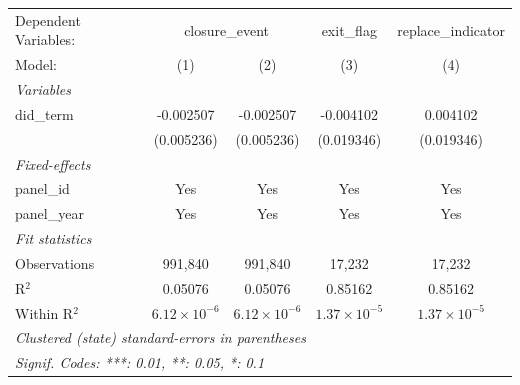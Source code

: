 
\begingroup
\centering
\begin{tabular}{lcccc}
   \tabularnewline \midrule \midrule
   Dependent Variables: & \multicolumn{2}{c}{closure\_event} & exit\_flag & replace\_indicator\\
   Model:       & (1)                   & (2)                   & (3)                   & (4)\\  
   \midrule
   \emph{Variables}\\
   did\_term    & -0.002507             & -0.002507             & -0.004102             & 0.004102\\   
                & (0.005236)            & (0.005236)            & (0.019346)            & (0.019346)\\   
   \midrule
   \emph{Fixed-effects}\\
   panel\_id    & Yes                   & Yes                   & Yes                   & Yes\\  
   panel\_year  & Yes                   & Yes                   & Yes                   & Yes\\  
   \midrule
   \emph{Fit statistics}\\
   Observations & 991,840               & 991,840               & 17,232                & 17,232\\  
   R$^2$        & 0.05076               & 0.05076               & 0.85162               & 0.85162\\  
   Within R$^2$ & $6.12\times 10^{-6}$  & $6.12\times 10^{-6}$  & $1.37\times 10^{-5}$  & $1.37\times 10^{-5}$\\   
   \midrule \midrule
   \multicolumn{5}{l}{\emph{Clustered (state) standard-errors in parentheses}}\\
   \multicolumn{5}{l}{\emph{Signif. Codes: ***: 0.01, **: 0.05, *: 0.1}}\\
\end{tabular}
\par\endgroup


